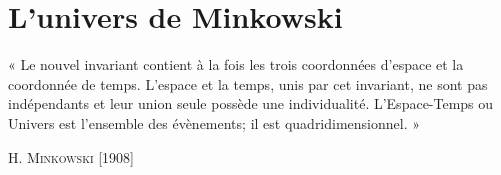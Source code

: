 \chapter{ L'univers de Minkowski}

\begin{minipage}[c]{.45\linewidth}
\end{minipage}
\hfill
\begin{minipage}[c]{.45\linewidth}
\footnotesize
« Le nouvel invariant contient à la fois les trois coordonnées d'espace et la coordonnée de temps. L'espace et la temps, unis par cet invariant, ne sont pas indépendants et leur union seule possède une individualité. L'Espace-Temps ou Univers est l'ensemble des évènements; il est quadridimensionnel. »

H. \textsc{Minkowski} [1908]
\normalsize
\end{minipage}
